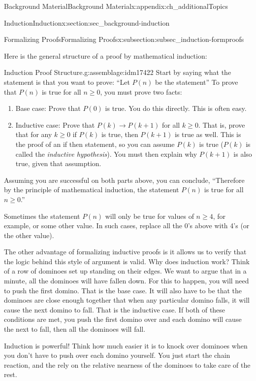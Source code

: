 \documentclass[oneside,10pt,]{book}
\numberwithin{equation}{chapter}
\def\imp{\rightarrow}
\begin{document}
\begin{appendixptx}{Background Material}{}{Background Material}{}{}{x:appendix:ch_additionalTopics}
\begin{sectionptx}{Induction}{}{Induction}{}{}{x:section:sec_background-induction}
\begin{subsectionptx}{Formalizing Proofs}{}{Formalizing Proofs}{}{}{x:subsection:subsec_induction-formproofs}
\par
Here is the general structure of a proof by mathematical induction:%
\begin{assemblage}{Induction Proof Structure.}{g:assemblage:idm17422}%
 Start by saying what the statement is that you want to prove: ``Let \(P(n)\) be the statement\textellipsis{}'' To prove that \(P(n)\) is true for all \(n \ge 0\), you must prove two facts:%
\begin{enumerate}
\item{}Base case: Prove that \(P(0)\) is true. You do this directly. This is often easy.%
\item{}Inductive case: Prove that \(P(k) \imp P(k+1)\) for all \(k \ge 0\). That is, prove that for any \(k \ge 0\) if \(P(k)\) is true, then \(P(k+1)\) is true as well. This is the proof of an if \textellipsis{} then \textellipsis{} statement, so you can assume \(P(k)\) is true (\(P(k)\) is called the \emph{inductive hypothesis}). You must then explain why \(P(k+1)\) is also true, given that assumption.%
\end{enumerate}
%
\par
Assuming you are successful on both parts above, you can conclude, ``Therefore by the principle of mathematical induction, the statement \(P(n)\) is true for all \(n \ge 0\).''%
\end{assemblage}
Sometimes the statement \(P(n)\) will only be true for values of \(n \ge 4\), for example, or some other value. In such cases, replace all the 0's above with 4's (or the other value).%
\par
The other advantage of formalizing inductive proofs is it allows us to verify that the logic behind this style of argument is valid. Why does induction work? Think of a row of dominoes set up standing on their edges. We want to argue that in a minute, all the dominoes will have fallen down. For this to happen, you will need to push the first domino. That is the base case. It will also have to be that the dominoes are close enough together that when any particular domino falls, it will cause the next domino to fall. That is the inductive case. If both of these conditions are met, you push the first domino over and each domino will cause the next to fall, then all the dominoes will fall.%
\par
Induction is powerful! Think how much easier it is to knock over dominoes when you don't have to push over each domino yourself. You just start the chain reaction, and the rely on the relative nearness of the dominoes to take care of the rest.%

\end{subsectionptx}
\end{sectionptx}
\end{appendixptx}
\end{document}
